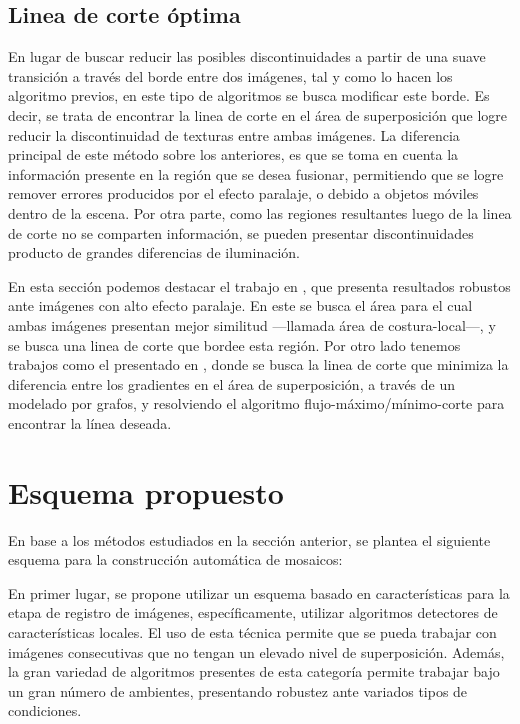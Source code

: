 \subsection*{Linea de corte óptima}

En lugar de buscar reducir las posibles discontinuidades a partir de una suave transición a través del borde entre dos imágenes, tal y como lo hacen los algoritmo previos, en este tipo de algoritmos se busca modificar este borde. Es decir, se trata de encontrar la linea de corte en el área de superposición que logre reducir la discontinuidad de texturas entre ambas imágenes. La diferencia principal de este método sobre los anteriores, es que se toma en cuenta la información presente en la región que se desea fusionar, permitiendo que se logre remover errores producidos por el efecto paralaje, o debido a objetos móviles dentro de la escena. Por otra parte, como las regiones resultantes luego de la linea de corte no se comparten información, se pueden presentar discontinuidades producto de grandes diferencias de iluminación.

En esta sección podemos destacar el trabajo en \cite{zhang}, que presenta resultados robustos ante imágenes con alto efecto paralaje. En este se busca el área para el cual ambas imágenes presentan mejor similitud ---llamada área de costura-local---, y se busca una linea de corte que bordee esta región. Por otro lado tenemos trabajos como el presentado en \cite{watershed}, donde se busca la linea de corte que minimiza la diferencia entre los gradientes en el área de superposición, a través de un modelado por grafos, y resolviendo el algoritmo flujo-máximo/mínimo-corte \cite{maxflow} para encontrar la línea deseada.


\section{Esquema propuesto}

En base a los métodos estudiados en la sección anterior, se plantea el siguiente esquema para la construcción automática de mosaicos:

En primer lugar, se propone utilizar un esquema basado en características para la etapa de registro de imágenes, específicamente, utilizar algoritmos detectores de características locales. El uso de esta técnica permite que se pueda trabajar con imágenes consecutivas que no tengan un elevado nivel de superposición. Además, la gran variedad de algoritmos presentes de esta categoría permite trabajar bajo un gran número de ambientes, presentando robustez ante variados tipos de condiciones. 

